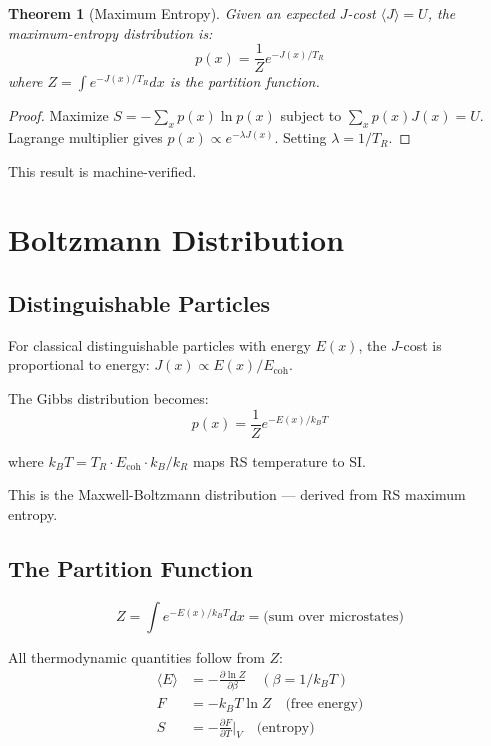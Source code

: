 \documentclass[12pt,a4paper]{article}
\newtheorem{theorem}{Theorem}[section]
\theoremstyle{definition}
\theoremstyle{remark}
\begin{document}
\begin{theorem}[Maximum Entropy]
Given an expected $J$-cost $\langle J \rangle = U$, 
the maximum-entropy distribution is:
\begin{equation}
p(x) = \frac{1}{Z} e^{-J(x)/T_R}
\end{equation}
where $Z = \int e^{-J(x)/T_R} dx$ is the partition function.
\end{theorem}

\begin{proof}
Maximize $S = -\sum_x p(x) \ln p(x)$ subject to $\sum_x p(x) J(x) = U$. 
Lagrange multiplier gives $p(x) \propto e^{-\lambda J(x)}$. Setting $\lambda = 1/T_R$.
\end{proof}

This result is machine-verified.

\section{Boltzmann Distribution}

\subsection{Distinguishable Particles}

For classical distinguishable particles with energy $E(x)$, the $J$-cost 
is proportional to energy: $J(x) \propto E(x)/E_\mathrm{coh}$.

The Gibbs distribution becomes:
\begin{equation}
p(x) = \frac{1}{Z} e^{-E(x)/k_B T}
\end{equation}

where $k_B T = T_R \cdot E_\mathrm{coh} \cdot k_B/k_R$ maps RS temperature to SI.

This is the Maxwell-Boltzmann distribution — derived from RS maximum entropy.

\subsection{The Partition Function}

\begin{equation}
Z = \int e^{-E(x)/k_B T} dx = \text{(sum over microstates)}
\end{equation}

All thermodynamic quantities follow from $Z$:
\begin{align}
\langle E \rangle &= -\frac{\partial \ln Z}{\partial \beta} \quad (\beta = 1/k_B T)\\
F &= -k_B T \ln Z \quad \text{(free energy)}\\
S &= -\frac{\partial F}{\partial T}\bigg|_V \quad \text{(entropy)}
\end{align}
\end{document}
